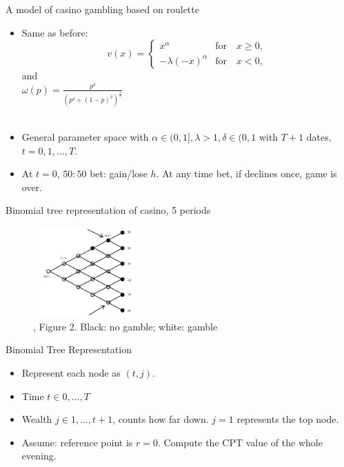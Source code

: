 \begin{frame}{A model of casino gambling based on roulette}
    \begin{itemize}
    \item Same as before:\medskip
        \[
        v(x) = \begin{cases}
            x^\alpha  &  \text{for} \quad x \geq 0,\\
            -\lambda (-x)^\alpha & \text{for} \quad x<0,
            \end{cases}
        \]\medskip
        and \\
        {\centering $ \omega(p)=\frac{p^\delta }{(p^\delta + (1-p)^\delta)^{\frac{1}{\delta}}} $\\

        }
        \hspace*{\fill} \\
    \item General parameter space  with $\alpha \in (0,1], \lambda>1,  \delta \in (0,1 $ with $T+1$ dates, $t=0,1,...,T.$ \medskip
    \item At $t=0$, $50:50$ bet: gain/lose $h$. At any time bet, if declines once, game is over.\medskip
    \end{itemize}
\end{frame}

\begin{frame}{Binomial tree representation of casino, 5 periods}
    \begin{figure}
\centering
        \includegraphics[width = 0.35\textwidth]{fig2.png}
    \caption{\citet{Barberis2012a}, Figure 2. Black: no gamble; white: gamble}
    \end{figure}
    \end{frame}

\begin{frame}{Binomial Tree Representation}
    \begin{itemize}
        \item Represent each node as $(t, j)$.\bigskip
        \item Time $t \in {0,\ldots ,T}$ \bigskip
        \item Wealth $ j \in {1,\ldots, t+1}$, counts how far down. $j=1$ represents the top node.\bigskip
        \item Assume: reference point is $r=0$. Compute the CPT value of the whole evening.\bigskip
    \end{itemize}
\end{frame}


